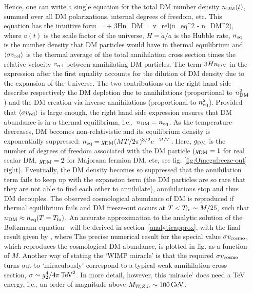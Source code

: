 Hence, one can write a single equation for the total DM number density $n_{\rm DM}(t)$, summed over all DM polarizations, internal degrees of freedom, etc.
This equation has the intuitive form
\beq {}  =  + 3Hn_{\rm DM} = \langle \sigma v_{\rm rel}\rangle (n_{\rm eq}^2 - n_{\rm DM}^2),
\label{eq:BoltznDM}
\eeq
where $a(t)$ is the scale factor of the universe, $H = \dot a/a$ is the Hubble rate, $n_{\rm eq}$ is the number density that
DM particles would have in thermal equilibrium and $ \langle \sigma v_{\rm rel}\rangle$ is the thermal average of the total annihilation cross section times the relative velocity $v_{\rm rel}$ between annihilating DM particles. 
The term $3Hn_{\rm DM}$ in the expression after the first equality accounts for the dilution of DM density due to the expansion of the Universe.
The two contributions on the right  hand side describe respectively the DM depletion due to annihilations (proportional to $n_{\rm DM}^2$)
and the DM creation via inverse annihilations (proportional to $n^2_{\rm eq}$).
Provided that $ \langle \sigma v_{\rm rel}\rangle$ is  large enough, 
the right hand side expression ensures that DM abundance is in a thermal equilibrium, i.e.,~$n_{\rm DM}=n_{\rm eq}$. 
As the temperature decreases, DM becomes non-relativistic and its equilibrium density is exponentially suppressed: $n_{\rm eq}= g_{\rm DM} (MT/2\pi)^{3/2} e^{-M/T}$.
Here, $g_{\rm DM}$ is the number of degrees of freedom associated with the DM particle ($g_{\rm DM}=1$ for real scalar DM, $g_{\rm DM}=2$ for Majorana fermion DM, etc, see fig. \ref{fig:Omegafreeze-out} right).
Eventually, the DM density becomes so suppressed that the annihilation term fails to keep up with the expansion term (the DM particles are so rare that they are not able to find each other to annihilate), annihilations stop and thus DM decouples.
The observed cosmological abundance of DM is reproduced if thermal equilibrium fails and DM freeze-out occurs at
 $T < T_{\rm fo}\sim M/25$, such that $n_{\rm DM} \approx n_{\rm eq}(T=T_{\rm fo})$. 
 An accurate approximation to the analytic solution of the Boltzmann equation~\cite{DMFO}
 will be derived in section~\ref{analyticapprox}, with the final result given by
\beq {} \approx {},
\label{eq:OmegaDMapprox}
\eeq
where
\beq
\label{eq:sigmavcosmo}
\eeq
The precise numerical result for the special value $\sigma v_{\rm cosmo} $, which reproduces the
cosmological DM abundance, is plotted in fig. as a function of $M$.
Another way of stating the `WIMP miracle'  is that the required $\sigma v_{\rm cosmo}$
turns out to `miraculously' correspond to a typical weak annihilation cross section, $\sigma\sim g_2^4/4\pi\, {\rm TeV}^2$.
In more detail, however, this `miracle' does need a TeV energy, i.e., an order of magnitude above $M_{W,Z,h}\sim 100\,{\rm GeV}$.


